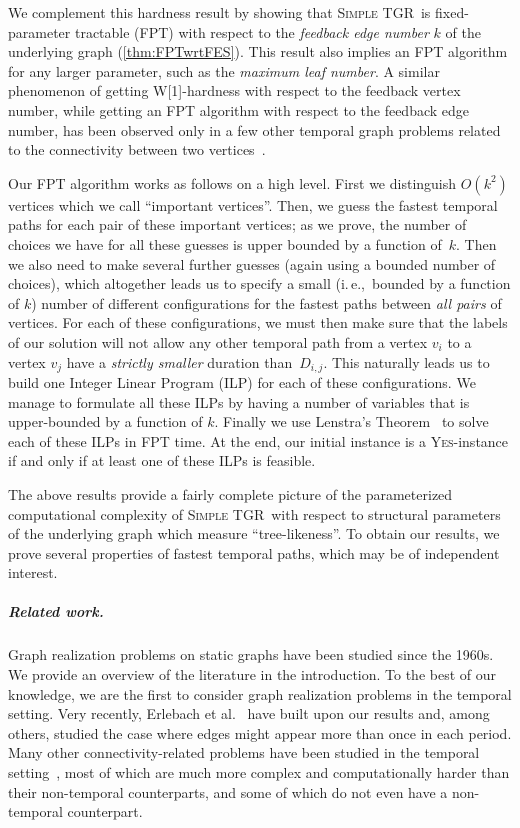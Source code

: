\documentclass[a4paper,UKenglish,cleveref, autoref, thm-restate]{lipics-v2021}
\newcommand{\ie}{i.\,e.,\ }
\newcommand{\deltaExact}{\textsc{Simple TGR}}
\begin{document}
We complement this hardness result by showing that \deltaExact\ is fixed-parameter tractable (FPT) with respect to the \emph{feedback edge number} $k$ of the underlying graph (\cref{thm:FPTwrtFES}). 
This result also implies an FPT algorithm for any larger parameter, such as the \emph{maximum leaf number}. 
A similar phenomenon of getting W[1]-hardness with respect to the feedback vertex number, while getting an FPT algorithm with respect to the feedback edge number, has been observed only in a few other temporal graph problems related to the connectivity between two vertices~\cite{casteigts2021finding,FMNR22a,EMM22}.

Our FPT algorithm works as follows on a high level. 
First we distinguish $O(k^2)$ vertices which we call ``important vertices''. 
Then, we guess the fastest temporal paths for each pair of these important vertices; as we prove, the number of choices we have for all these guesses is upper bounded by a function of~$k$. 
Then we also need to make several further guesses (again using a bounded number of choices), which altogether leads us to specify a small (\ie bounded by a function of $k$) number of different configurations for the fastest paths between \emph{all pairs} of vertices. For each of these configurations, we must then make sure that the labels of our solution will not allow any other temporal path from a vertex $v_i$ to a vertex $v_j$ have a \emph{strictly smaller} duration than~$D_{i,j}$.
This naturally leads us to build one Integer Linear Program (ILP) for each of these configurations. We manage to formulate all these ILPs by having a number of variables that is upper-bounded by a function of $k$. Finally we use Lenstra's Theorem~\cite{Lenstra1983Integer} to solve each of these ILPs in FPT time. At the end, our initial instance is a \textsc{Yes}-instance if and only if at least one of these ILPs is feasible.



The above results provide a fairly complete picture of the parameterized computational complexity of \deltaExact\ with respect to structural parameters of the underlying graph which measure ``tree-likeness''. To obtain our results, we prove several properties of fastest temporal paths, which may be of independent interest.


\subparagraph{Related work.} Graph realization problems on static graphs have been studied since the 1960s. We provide an overview of the literature in the introduction. 
To the best of our knowledge, we are the first to consider graph realization problems in the temporal setting. 
Very recently, Erlebach et al.~\cite{ErlebachMW-SAND24} have built upon our results and, among others, studied the case where edges might appear more than once in each period. 
Many other connectivity-related problems have been studied in the temporal setting~\cite{Mertzios-transitivity21,Akrida-explorer-21,enright2021deleting,MolterRZ21,klobas2023interference,deligkas2022optimizing,erlebach2021temporal,Flu+19a,Zsc+19,CasteigtsCS22,FuchsleMNR22}, most of which are much more complex and computationally harder than their non-temporal counterparts, and some of which do not even have a non-temporal counterpart.
\end{document}
